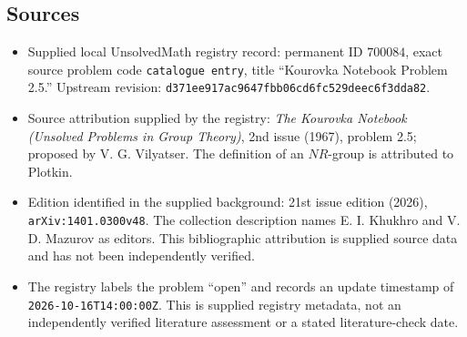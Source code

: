 \documentclass[11pt]{article}
\begin{document}
\subsection{Sources}
\begin{itemize}
\item Supplied local UnsolvedMath registry record: permanent ID \(700084\), exact source problem code \texttt{catalogue entry}, title ``Kourovka Notebook Problem 2.5.'' Upstream revision: \texttt{d371ee917ac9647fbb06cd6fc529deec6f3dda82}.
\item Source attribution supplied by the registry: \emph{The Kourovka Notebook (Unsolved Problems in Group Theory)}, 2nd issue (1967), problem 2.5; proposed by V. G. Vilyatser. The definition of an \(NR\)-group is attributed to Plotkin.
\item Edition identified in the supplied background: 21st issue edition (2026), \texttt{arXiv:1401.0300v48}. The collection description names E. I. Khukhro and V. D. Mazurov as editors. This bibliographic attribution is supplied source data and has not been independently verified.
\item The registry labels the problem ``open'' and records an update timestamp of \texttt{2026-10-16T14:00:00Z}. This is supplied registry metadata, not an independently verified literature assessment or a stated literature-check date.
\end{itemize}
\end{document}
